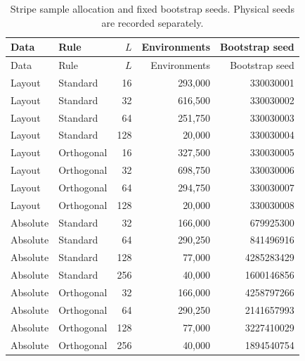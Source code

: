 {\small\setlength{\tabcolsep}{3.5pt}
\begin{longtable}{llrrr}
\caption{Stripe sample allocation and fixed bootstrap seeds. Physical seeds are recorded separately.}\\
\toprule
Data & Rule & $L$ & Environments & Bootstrap seed\\
\midrule
\endfirsthead
\toprule
Data & Rule & $L$ & Environments & Bootstrap seed\\
\midrule
\endhead
\bottomrule\endfoot
Layout & Standard & 16 & 293,000 & 330030001\\
Layout & Standard & 32 & 616,500 & 330030002\\
Layout & Standard & 64 & 251,750 & 330030003\\
Layout & Standard & 128 & 20,000 & 330030004\\
Layout & Orthogonal & 16 & 327,500 & 330030005\\
Layout & Orthogonal & 32 & 698,750 & 330030006\\
Layout & Orthogonal & 64 & 294,750 & 330030007\\
Layout & Orthogonal & 128 & 20,000 & 330030008\\
Absolute & Standard & 32 & 166,000 & 679925300\\
Absolute & Standard & 64 & 290,250 & 841496916\\
Absolute & Standard & 128 & 77,000 & 4285283429\\
Absolute & Standard & 256 & 40,000 & 1600146856\\
Absolute & Orthogonal & 32 & 166,000 & 4258797266\\
Absolute & Orthogonal & 64 & 290,250 & 2141657993\\
Absolute & Orthogonal & 128 & 77,000 & 3227410029\\
Absolute & Orthogonal & 256 & 40,000 & 1894540754\\
\end{longtable}}
